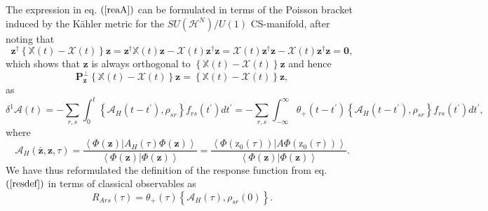 \documentclass[aps,preprint]{revtex4}%
\begin{document}
The expression in eq. $\left(  \ref{reaA}\right)  $ can be formulated in terms
of the Poisson bracket induced by the K\"{a}hler metric for the $SU\left(
\mathcal{H}^{N}\right)  /U\left(  1\right)  $ CS-manifold, after noting that
\begin{equation}
\mathbf{z}^{\dagger}\left\{  \mathbb{X}\left(  t\right)  -\mathcal{X}\left(
t\right)  \right\}  \mathbf{z=z}^{\dagger}\mathbb{X}\left(  t\right)
\mathbf{z}-\mathcal{X}\left(  t\right)  \mathbf{z}^{\dagger}\mathbf{z}%
=\mathcal{X}\left(  t\right)  \mathbf{z}^{\dagger}\mathbf{z-}\mathcal{X}%
\left(  t\right)  \mathbf{z}^{\dagger}\mathbf{z=0,}%
\end{equation}
which shows that $\mathbf{z}$ is always orthogonal to $\left\{  \mathbb{X}%
\left(  t\right)  -\mathcal{X}\left(  t\right)  \right\}  \mathbf{z}$ and
hence
\begin{equation}
\mathbf{P}_{\mathbf{z}}^{\bot}\left\{  \mathbb{X}\left(  t\right)
-\mathcal{X}\left(  t\right)  \right\}  \mathbf{z=}\left\{  \mathbb{X}\left(
t\right)  -\mathcal{X}\left(  t\right)  \right\}  \mathbf{z,}%
\end{equation}
as
\begin{equation}
\delta^{1}\mathcal{A}\left(  t\right)  =-\sum_{r,s}\int_{0}^{t}\left\{
\mathcal{A}_{H}\left(  t-t^{\prime}\right)  ,\rho_{sr}\right\}  f_{rs}\left(
t^{\prime}\right)  dt^{\prime}=-\sum_{r,s}\int_{-\infty}^{\infty}\theta
_{+}\left(  t-t^{\prime}\right)  \left\{  \mathcal{A}_{H}\left(  t-t^{\prime
}\right)  ,\rho_{sr}\right\}  f_{rs}\left(  t^{\prime}\right)  dt^{\prime},
\end{equation}
where
\begin{equation}
\mathcal{A}_{H}\left(  \mathbf{\bar{z},z,}\tau\right)  =\frac{\left\langle
\left.  \Phi\left(  \mathbf{z}\right)  \right\vert A_{H}\left(  \tau\right)
\Phi\left(  \mathbf{z}\right)  \right\rangle }{\left\langle \left.
\Phi\left(  \mathbf{z}\right)  \right\vert \Phi\left(  \mathbf{z}\right)
\right\rangle }=\frac{\left\langle \left.  \Phi\left(  \mathrm{z}_{0}\left(
\tau\right)  \right)  \right\vert A\Phi\left(  \mathrm{z}_{0}\left(
\tau\right)  \right)  \right\rangle }{\left\langle \left.  \Phi\left(
\mathbf{z}\right)  \right\vert \Phi\left(  \mathbf{z}\right)  \right\rangle }.
\end{equation}
We have thus reformulated the definition of the response function from eq.
$\left(  \ref{resdef}\right)  $ in terms of classical observables as
\begin{equation}
R_{Ars}\left(  \tau\right)  =\theta_{+}\left(  \tau\right)  \left\{
\mathcal{A}_{H}\left(  \tau\right)  ,\rho_{sr}\left(  0\right)  \right\}  .
\end{equation}
\end{document}
